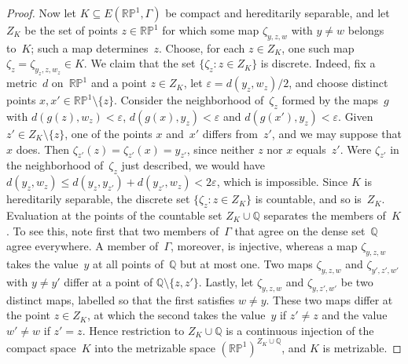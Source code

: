 \documentclass[psamsfonts]{amsart}
\theoremstyle{definition}
\theoremstyle{remark}
\newcommand{\RP}{\mathbb{R}\mathbb{P}}
\numberwithin{equation}{section}
\begin{document}
\begin{proof}
Now let $K\subseteq E(\RP^1,\Gamma)$ be compact and hereditarily separable, and let $Z_K$ be the set of points $z\in\RP^1$ for which some map $\zeta_{y,z,w}$ with $y\neq w$ belongs to~$K$;
such a map determines~$z$.
Choose, for each $z\in Z_K$, one such map $\zeta_z=\zeta_{y_z,z,w_z}\in K$.
We claim that the set $\{\zeta_z:z\in Z_K\}$ is discrete.
Indeed, fix a metric~$d$ on~$\RP^1$ and a point $z\in Z_K$, let $\varepsilon=d(y_z,w_z)/2$, and choose distinct points $x,x'\in\RP^1\setminus\{z\}$.
Consider the neighborhood of~$\zeta_z$ formed by the maps~$g$ with $d(g(z),w_z)<\varepsilon$, $d(g(x),y_z)<\varepsilon$ and $d(g(x'),y_z)<\varepsilon$.
Given $z'\in Z_K\setminus\{z\}$, one of the points $x$ and~$x'$ differs from~$z'$, and we may suppose that $x$ does.
Then $\zeta_{z'}(z)=\zeta_{z'}(x)=y_{z'}$, since neither $z$ nor $x$ equals~$z'$.
Were $\zeta_{z'}$ in the neighborhood of~$\zeta_z$ just described, we would have $d(y_z,w_z)\le d(y_z,y_{z'})+d(y_{z'},w_z)<2\varepsilon$, which is impossible.
Since $K$ is hereditarily separable, the discrete set $\{\zeta_z:z\in Z_K\}$ is countable, and so is~$Z_K$.
Evaluation at the points of the countable set $Z_K\cup\mathbb{Q}$ separates the members of~$K$.
To see this, note first that two members of~$\Gamma$ that agree on the dense set~$\mathbb{Q}$ agree everywhere.
A member of~$\Gamma$, moreover, is injective, whereas a map $\zeta_{y,z,w}$ takes the value~$y$ at all points of~$\mathbb{Q}$ but at most one.
Two maps $\zeta_{y,z,w}$ and $\zeta_{y',z',w'}$ with $y\neq y'$ differ at a point of $\mathbb{Q}\setminus\{z,z'\}$.
Lastly, let $\zeta_{y,z,w}$ and $\zeta_{y,z',w'}$ be two distinct maps, labelled so that the first satisfies $w\neq y$.
These two maps differ at the point $z\in Z_K$, at which the second takes the value~$y$ if $z'\neq z$ and the value $w'\neq w$ if $z'=z$.
Hence restriction to $Z_K\cup\mathbb{Q}$ is a continuous injection of the compact space~$K$ into the metrizable space $(\RP^1)^{Z_K\cup\mathbb{Q}}$, and $K$ is metrizable.


\end{proof}
\end{document}
